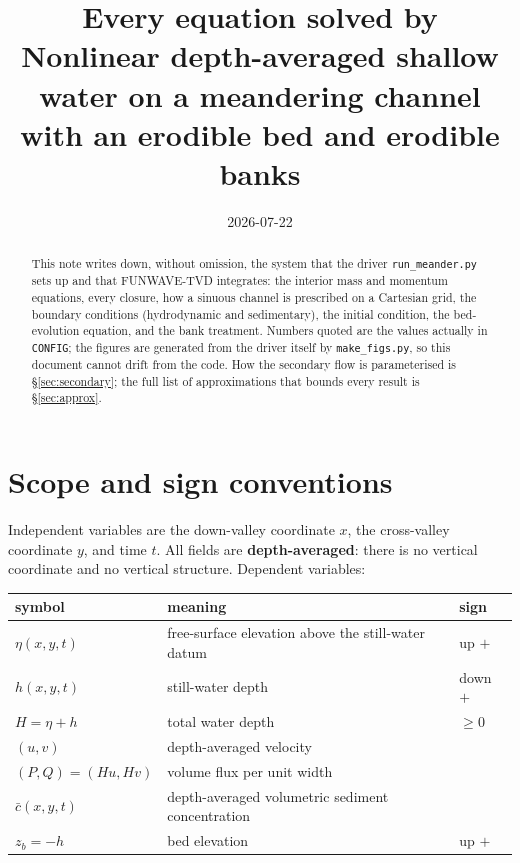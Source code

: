 \documentclass[11pt,a4paper]{article}
\title{Every equation solved by \code{funwave\_2d\_sw/run\_meander.py}\\
\large Nonlinear depth-averaged shallow water on a meandering channel\\
with an erodible bed and erodible banks}
\author{\code{rossby\_palooza/numerical/funwave\_2d\_sw}}
\date{2026-07-22}
\newcommand{\code}[1]{\texttt{\small #1}}
\begin{document}
\maketitle

\begin{abstract}
\noindent
This note writes down, without omission, the system that the driver
\code{run\_meander.py} sets up and that FUNWAVE-TVD integrates: the interior mass and
momentum equations, every closure, how a sinuous channel is prescribed on a Cartesian
grid, the boundary conditions (hydrodynamic and sedimentary), the initial condition, the
bed-evolution equation, and the bank treatment. Numbers quoted are the values actually
in \code{CONFIG}; the figures are generated from the driver itself by
\code{make\_figs.py}, so this document cannot drift from the code. How the secondary flow is
parameterised is \S\ref{sec:secondary}; the full list of approximations that bounds every
result is \S\ref{sec:approx}.
\end{abstract}

\tableofcontents

\section{Scope and sign conventions}

Independent variables are the down-valley coordinate $x$, the cross-valley coordinate
$y$, and time $t$. All fields are \textbf{depth-averaged}: there is no vertical
coordinate and no vertical structure. Dependent variables:

\begin{center}
\begin{tabular}{lll}
\toprule
symbol & meaning & sign \\
\midrule
$\eta(x,y,t)$ & free-surface elevation above the still-water datum & up $+$ \\
$h(x,y,t)$ & still-water depth & down $+$ \\
$H=\eta+h$ & total water depth & $\ge 0$ \\
$(u,v)$ & depth-averaged velocity & \\
$(P,Q)=(Hu,Hv)$ & volume flux per unit width & \\
$\bar c(x,y,t)$ & depth-averaged volumetric sediment concentration & \\
$z_b=-h$ & bed elevation & up $+$ \\
\bottomrule
\end{tabular}
\end{center}
\end{document}

